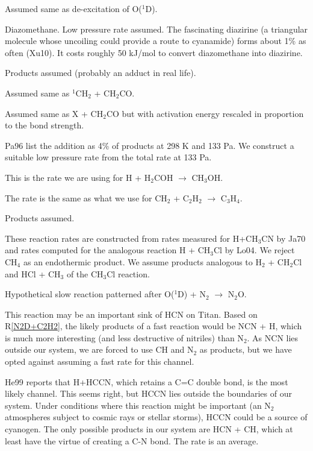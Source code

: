 \documentclass[12pt,landscape]{article}
\newcounter{reaction}
\begin{document}
 Assumed same as de-excitation of O($^1$D).

 Diazomethane.  Low pressure rate assumed.  The fascinating diazirine (a triangular molecule whose uncoiling could provide a route to cyanamide) forms about 1\% as often (Xu10).  It costs roughly 50 kJ/mol to convert diazomethane into diazirine.

 Products assumed (probably an adduct in real life).

 Assumed same as $^1$CH$_2$ + CH$_2$CO.

 Assumed same as X + CH$_2$CO but with activation energy rescaled in proportion to the bond strength. 

 Pa96 list the addition as 4\% of products at 298 K and 133 Pa.  We construct a suitable low pressure rate
from the total rate at 133 Pa. 

  This is the rate we are using for H + H$_2$COH $\rightarrow$ CH$_3$OH.

  The rate is the same as what we use for CH$_2$ + C$_2$H$_2$ $\rightarrow$ C$_3$H$_4$.

 Products assumed.

  These reaction rates are constructed from rates measured for H+CH$_3$CN by Ja70 and rates computed
for the analogous reaction H + CH$_3$Cl by Lo04. We reject CH$_4$ as an endothermic product.  We assume products
analogous to H$_2$ + CH$_2$Cl and HCl + CH$_3$ of the CH$_3$Cl reaction. 

  Hypothetical slow reaction patterned after  O($^1$D) + N$_2$ $\rightarrow$ N$_2$O.

 This reaction may be an important sink of HCN on Titan.  
Based on R\ref{N2D+C2H2}, the likely products of a fast reaction would be NCN + H, which is much more interesting (and less destructive of nitriles) than N$_2$.
As NCN lies outside our system, we are forced to use CH and N$_2$ as products, but we have opted against assuming a fast rate for this channel.    

  He99 reports that H+HCCN, which retains a C=C double bond, is the most likely channel. This seems right, but
HCCN lies outside the boundaries of our system. Under conditions where this reaction might be important (an N$_2$ atmospheres subject to cosmic rays or stellar storms), HCCN could be a source of cyanogen.  The only possible products in our system are HCN + CH, which at least have the virtue of creating a C-N bond.  The rate is an average.  
\end{document}
